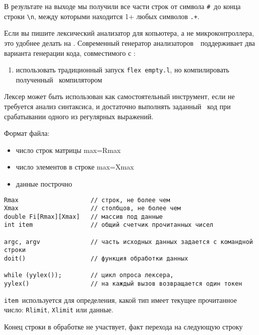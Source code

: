 В результате на выходе мы получили все части строк от символа \verb|#|\ до
конца строки \verb|\n|, между которыми находится 1+ любых символов \verb|.+|.


Если вы пишите лексический анализатор для копьютера, а не микроконтроллера,
это удобнее делать на \cpp. Современный генератор анализаторов\
\ поддерживает два варианта генерации кода, совместимого с \cpp:

\begin{enumerate}
\item использовать традиционный запуск \verb|flex empty.l|, но компилировать
полученный \file{lex.yy.c}\ компилятором \prog{g++}
\end{enumerate}  

\secup



\secdown

\begin{framed}
\noindent Лексер может быть использован как самостоятельный инструмент, если
не требуется анализ синтаксиса, и достаточно выполнять заданный \cpp\ код
при срабатывании одного из регулярных выражений.
\end{framed}


Формат файла: \bigskip

\begin{itemize}[nosep]
\item число строк матрицы max=Rmax
\item число элементов в строке max=Xmax
\item данные построчно
\end{itemize}


\begin{verbatim}
Rmax 					// строк, не более чем 
Xmax 					// столбцов, не более чем
double Fi[Rmax][Xmax]	// массив под данные
int item				// общий счетчик прочитанных чисел

argc, argv				// часть исходных данных задается с командной строки
doit()					// функция обработки данных

while (yylex());		// цикл опроса лексера,
yylex()					// на каждый вызов возвращается один токен
\end{verbatim}

\verb|item|\ используется для определения, какой тип имеет текущее 
прочитанное число: \verb|Rlimit|, \verb|Xlimit| или данные.

Конец строки в обработке не участвует, факт перехода на следующую строку
